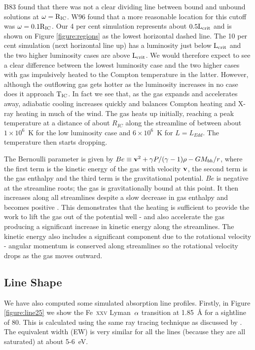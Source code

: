 \documentclass[a4paper,fleqn,usenatbib]{mnras}
\begin{document}
B83 found that there was not a clear dividing line between bound and unbound solutions 
at $\rm{\omega=R_{IC}}$. W96 found that a more reasonable location for this cutoff was 
$\rm{\omega=0.1 R_{IC}}$.
Our 4 per cent simulation represents about $\rm{0.5 L_{crit}}$ and is shown on Figure \ref{figure:regions} as the lowest 
horizontal dashed line. The 10 per cent simulation (next horizontal line up) has a luminosity just below $\rm{L_{crit}}$ 
and
the two higher luminosity cases are above $\rm{L_{crit}}$. We would therefore expect to see a clear difference between the lowest luminosity case and the two higher cases with gas impulsively heated to the Compton
temperature in the latter. However, although the outflowing gas gets hotter as the luminosity increases in no
case does it approach $\rm{T_{IC}}$. In fact we see that, as the gas expands and accelerates
away, adiabatic cooling increases quickly and balances Compton heating and X-ray heating in much of the wind. The gas heats up initially, reaching a peak temperature at a distance of about $R_{IC}$ along the streamline of between
about $1\times10^6$~K for the low luminosity case and $6\times10^6$~K for $L=L_{Edd}$. The temperature then starts dropping. 

The Bernoulli parameter is given by $Be\equiv\bold{v}^2+\gamma P/(\gamma-1)\rho-GM_{bh}/r$, where the first
term is the kinetic energy of the gas with velocity $\bold{v}$, the second term is the gas enthalpy and the third
term is the gravitational potential. $Be$ is negative at the streamline roots; the gas is gravitationally bound at 
this point. It then increases along all streamlines despite a slow decrease in gas enthalpy and becomes positive
. 
This demonstrates that the heating is
sufficient to provide the work to lift the gas out of the potential well - and also accelerate the gas producing a
significant increase in kinetic energy along the streamlines. The kinetic energy also includes a significant component
due to the rotational velocity - angular momentum is conserved along streamlines so the rotational velocity drops 
as the gas moves outward.






\subsection{Line Shape}
We have also computed some simulated absorption line profiles.
Firstly, in Figure \ref{figure:line25} we show the Fe~\textsc{xxv} Lyman~$\rm{\alpha}$ transition at 1.85~{\AA} for a 
sightline  of 80\degree . This is calculated using the same ray tracing technique as discussed 
by \cite{2015ApJ...807..107H}. The equivalent width (EW) is very similar for all the lines (because they are all 
saturated) at about 5-6~eV. 
\end{document}
